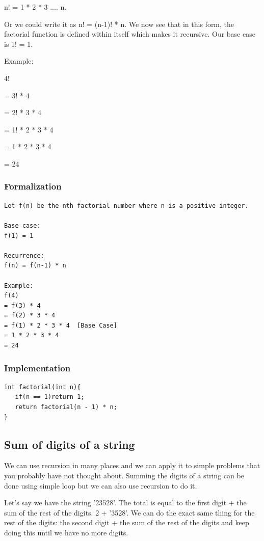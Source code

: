 \documentclass[11pt,oneside]{book}
\begin{document}
n! = 1 * 2 * 3 .... n.

Or we could write it as n! = (n-1)! * n. We now see that in this form, the factorial function is defined within itself which makes it recursive. Our base case is 1! = 1.

Example:

4!

= 3! * 4

= 2! * 3 * 4

= 1! * 2 * 3 * 4

= 1 * 2 * 3 * 4

= 24

\subsubsection{Formalization}

\begin{lstlisting}
Let f(n) be the nth factorial number where n is a positive integer.

Base case:
f(1) = 1

Recurrence:
f(n) = f(n-1) * n

Example:
f(4) 
= f(3) * 4
= f(2) * 3 * 4
= f(1) * 2 * 3 * 4  [Base Case]
= 1 * 2 * 3 * 4
= 24
\end{lstlisting}

\subsubsection{Implementation}

\begin{lstlisting}
int factorial(int n){
   if(n == 1)return 1;
   return factorial(n - 1) * n;
}
\end{lstlisting}

\subsection{Sum of digits of a string}

We can use recursion in many places and we can apply it to simple problems that you probably have not thought about. Summing the digits of a string can be done using simple loop but we can also use recursion to do it.

Let's say we have the string '23528'. The total is equal to the first digit + the sum of the rest of the digits. 2 + '3528'. We can do the exact same thing for the rest of the digits: the second digit + the sum of the rest of the digits and keep doing this until we have no more digits.
\end{document}
